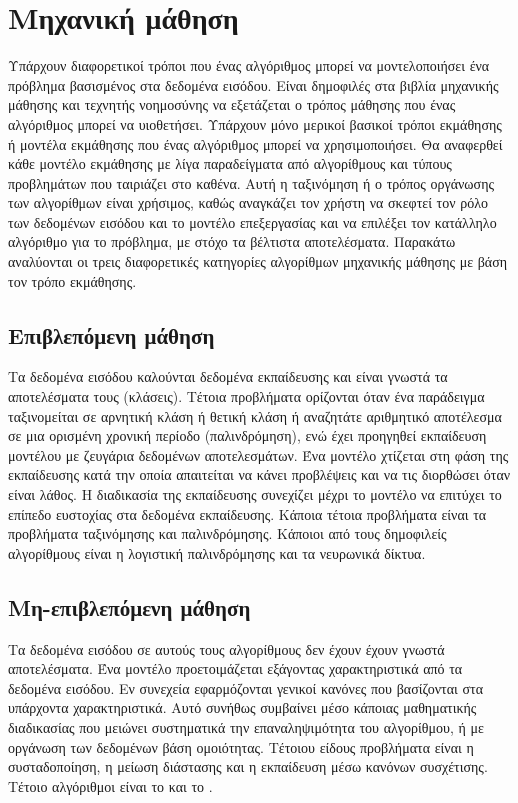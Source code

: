 \section{Μηχανική μάθηση}
Υπάρχουν διαφορετικοί τρόποι που ένας αλγόριθμος μπορεί να μοντελοποιήσει ένα πρόβλημα βασισμένος στα δεδομένα εισόδου. Είναι δημοφιλές στα βιβλία μηχανικής μάθησης και τεχνητής νοημοσύνης να εξετάζεται ο τρόπος μάθησης που ένας αλγόριθμος μπορεί να υιοθετήσει. Υπάρχουν μόνο μερικοί βασικοί τρόποι εκμάθησης ή μοντέλα εκμάθησης που ένας αλγόριθμος μπορεί να χρησιμοποιήσει. Θα αναφερθεί κάθε μοντέλο εκμάθησης με λίγα παραδείγματα από αλγορίθμους και τύπους προβλημάτων που ταιριάζει στο καθένα. Αυτή η ταξινόμηση ή ο τρόπος οργάνωσης των αλγορίθμων είναι χρήσιμος, καθώς αναγκάζει τον χρήστη να σκεφτεί τον ρόλο των δεδομένων εισόδου και το μοντέλο επεξεργασίας και να επιλέξει τον κατάλληλο αλγόριθμο για το πρόβλημα, με στόχο τα βέλτιστα αποτελέσματα. Παρακάτω αναλύονται οι τρεις διαφορετικές κατηγορίες αλγορίθμων μηχανικής μάθησης με βάση τον τρόπο εκμάθησης.
\subsection{Επιβλεπόμενη μάθηση}
Τα δεδομένα εισόδου καλούνται δεδομένα εκπαίδευσης και είναι γνωστά τα αποτελέσματα τους (κλάσεις). Τέτοια προβλήματα ορίζονται όταν ένα παράδειγμα ταξινομείται σε αρνητική κλάση ή θετική κλάση ή αναζητάτε αριθμητικό αποτέλεσμα σε μια ορισμένη χρονική περίοδο (παλινδρόμηση), ενώ έχει προηγηθεί εκπαίδευση μοντέλου με ζευγάρια δεδομένων αποτελεσμάτων. Ένα μοντέλο χτίζεται στη φάση της εκπαίδευσης κατά την οποία απαιτείται να κάνει προβλέψεις και να τις διορθώσει όταν είναι λάθος. Η διαδικασία της εκπαίδευσης συνεχίζει μέχρι το μοντέλο να επιτύχει το επίπεδο ευστοχίας στα δεδομένα εκπαίδευσης. Κάποια τέτοια προβλήματα είναι τα προβλήματα ταξινόμησης και παλινδρόμησης. Κάποιοι από τους δημοφιλείς αλγορίθμους είναι η λογιστική παλινδρόμησης και τα νευρωνικά δίκτυα.
\subsection{Μη-επιβλεπόμενη μάθηση}
Τα δεδομένα εισόδου σε αυτούς τους αλγορίθμους δεν έχουν έχουν γνωστά αποτελέσματα. Ένα μοντέλο προετοιμάζεται εξάγοντας χαρακτηριστικά από τα δεδομένα εισόδου. Εν συνεχεία εφαρμόζονται γενικοί κανόνες που βασίζονται στα υπάρχοντα χαρακτηριστικά. Αυτό συνήθως συμβαίνει μέσο κάποιας μαθηματικής διαδικασίας που μειώνει συστηματικά την επαναληψιμότητα του αλγορίθμου, ή με οργάνωση των δεδομένων βάση ομοιότητας. Τέτοιου είδους προβλήματα είναι η συσταδοποίηση, η μείωση διάστασης και η εκπαίδευση μέσω κανόνων συσχέτισης. Τέτοιο αλγόριθμοι είναι το  και το .
